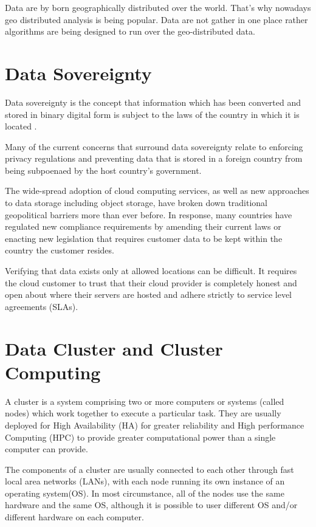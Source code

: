 \documentclass[12pt,notitlepage,oneside]{report}
\begin{document}
Data are by born geographically distributed over the world. That's why nowadays geo distributed analysis is being popular. Data are not gather in one place rather algorithms are being designed to run over the geo-distributed data.

\section{Data Sovereignty}

Data sovereignty is the concept that information which has been converted and stored in binary digital form is subject to the laws of the country in which it is located \cite{sovereign}.

Many of the current concerns that surround data sovereignty relate to enforcing privacy regulations and preventing data that is stored in a foreign country from being subpoenaed by the host country's government.

The wide-spread adoption of cloud computing services, as well as new approaches to data storage including object storage, have broken down traditional geopolitical barriers more than ever before. In response, many countries have regulated new compliance requirements by amending their current laws or enacting new legislation that requires customer data to be kept within the country the customer resides. 

Verifying that data exists only at allowed locations can be difficult. It requires the cloud customer to trust that their cloud provider is completely honest and open about where their servers are hosted and adhere strictly to service level agreements (SLAs).


\section{Data Cluster and Cluster Computing}
A cluster is a system comprising two or more computers or systems (called nodes) which work together to execute a particular task. They are usually deployed for High Availability (HA) for greater reliability and High performance Computing (HPC) to provide greater computational power than a single computer can provide.

The components of a cluster are usually connected to each other through fast local area networks (LANs), with each node running its own instance of an operating system(OS). In most circumstance, all of the nodes use the same hardware and the same OS, although it is possible to user different OS and/or different hardware on each computer.
\end{document}
